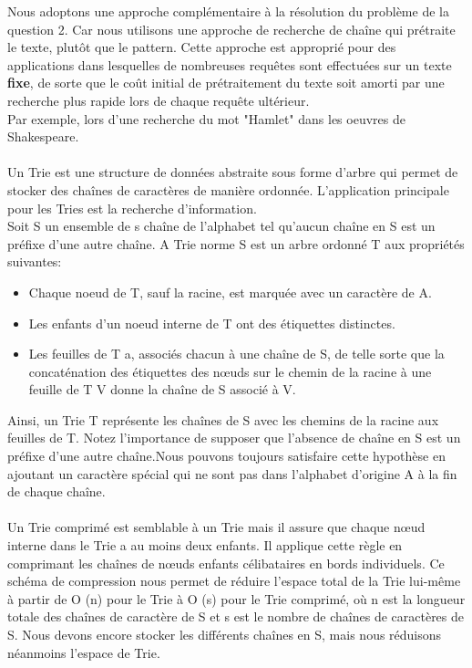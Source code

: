 \documentclass[10pt,a4paper]{article}
\begin{document}
Nous adoptons une approche complémentaire à la résolution du problème de la question 2. Car nous utilisons une approche de recherche de chaîne qui prétraite le texte, plutôt que le pattern. Cette approche est approprié pour des applications dans lesquelles de nombreuses requêtes sont effectuées sur un texte \textbf{fixe}, de sorte que le coût initial de prétraitement du texte soit amorti par une recherche plus rapide lors de chaque requête ultérieur.\\
Par exemple, lors d'une recherche du mot "Hamlet" dans les oeuvres de Shakespeare.\\
\\
Un Trie est une structure de données abstraite sous forme d'arbre qui permet de stocker des chaînes de caractères de manière ordonnée. L'application principale pour les Tries est la recherche d'information. \\
Soit S un ensemble de s chaîne de l'alphabet tel qu'aucun chaîne en S est un préfixe d'une autre chaîne. A Trie norme S est un arbre ordonné T aux propriétés suivantes:
\begin{itemize}

\item Chaque noeud de T, sauf la racine, est marquée avec un caractère de A.
\item Les enfants d'un noeud interne de T ont des étiquettes distinctes.
\item Les feuilles de T a, associés chacun à une chaîne de S, de telle sorte que la concaténation des étiquettes des nœuds sur le chemin de la racine à une feuille de T V donne la chaîne de S associé à V.

\end{itemize}

Ainsi, un Trie T représente les chaînes de S avec les chemins de la racine aux feuilles de T.
Notez l'importance de supposer que l'absence de chaîne en S est un préfixe d'une autre chaîne.Nous pouvons toujours satisfaire cette hypothèse en ajoutant un caractère spécial qui ne sont pas dans l'alphabet d'origine A à la fin de chaque chaîne.  \\\\

Un Trie comprimé est semblable à un Trie mais il assure que chaque nœud interne dans le Trie a au moins deux enfants. Il applique cette règle en comprimant les chaînes de nœuds enfants célibataires en bords individuels.
Ce schéma de compression nous permet de réduire l'espace total de la Trie lui-même à partir de O (n) pour le Trie à O (s) pour le Trie comprimé, où n est la longueur totale des chaînes de caractère de S et s est le nombre de chaînes de caractères de S. Nous devons encore stocker les différents chaînes en S, mais nous réduisons néanmoins l'espace de Trie.\\
\end{document}
